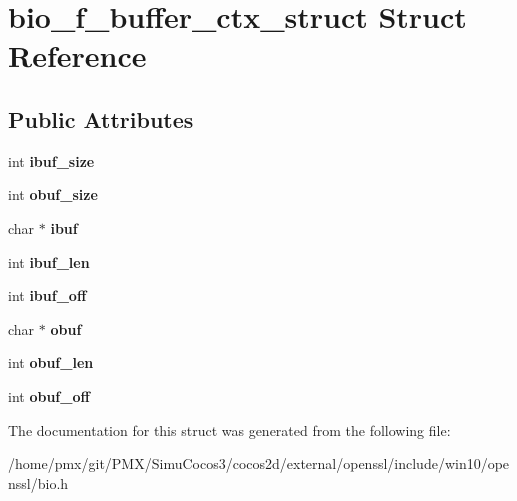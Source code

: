\hypertarget{structbio__f__buffer__ctx__struct}{}\section{bio\+\_\+f\+\_\+buffer\+\_\+ctx\+\_\+struct Struct Reference}
\label{structbio__f__buffer__ctx__struct}
\subsection*{Public Attributes}
\begin{DoxyCompactItemize}
\item 
\mbox{\label{structbio__f__buffer__ctx__struct_a2ef352eaf33c4d0414c494054d43a795}} 
int {\bfseries ibuf\+\_\+size}
\item 
\mbox{\label{structbio__f__buffer__ctx__struct_ac054193e554cf659d638b00484ba3b07}} 
int {\bfseries obuf\+\_\+size}
\item 
\mbox{\label{structbio__f__buffer__ctx__struct_a7d1c4d9f2365e5f41ae5dc3abef7a489}} 
char $\ast$ {\bfseries ibuf}
\item 
\mbox{\label{structbio__f__buffer__ctx__struct_aeac265d0eb617edf027d714cb22bee72}} 
int {\bfseries ibuf\+\_\+len}
\item 
\mbox{\label{structbio__f__buffer__ctx__struct_a4a05bfddcb84c53b98df8cf72d7626a0}} 
int {\bfseries ibuf\+\_\+off}
\item 
\mbox{\label{structbio__f__buffer__ctx__struct_a3b756daa7e6784f12e178c2f73b6cbe4}} 
char $\ast$ {\bfseries obuf}
\item 
\mbox{\label{structbio__f__buffer__ctx__struct_aa405c5c91239978aeabda2f9537db899}} 
int {\bfseries obuf\+\_\+len}
\item 
\mbox{\label{structbio__f__buffer__ctx__struct_a33d8e302dcb91873af9ed993094e1960}} 
int {\bfseries obuf\+\_\+off}
\end{DoxyCompactItemize}


The documentation for this struct was generated from the following file\+:\begin{DoxyCompactItemize}
\item 
/home/pmx/git/\+P\+M\+X/\+Simu\+Cocos3/cocos2d/external/openssl/include/win10/openssl/bio.\+h\end{DoxyCompactItemize}
